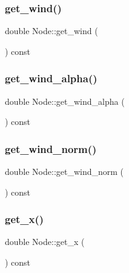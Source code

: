 \mbox{\label{class_node_a2d4f700eb12bf497b8d2a00376e82601}} 
\subsubsection{\texorpdfstring{get\_wind()}{get\_wind()}}
{\footnotesize\ttfamily double Node\+::get\+\_\+wind (\begin{DoxyParamCaption}{ }\end{DoxyParamCaption}) const}

\mbox{\label{class_node_ade32342e43c7fead12915f188afe5c9a}} 
\subsubsection{\texorpdfstring{get\_wind\_alpha()}{get\_wind\_alpha()}}
{\footnotesize\ttfamily double Node\+::get\+\_\+wind\+\_\+alpha (\begin{DoxyParamCaption}{ }\end{DoxyParamCaption}) const}

\mbox{\label{class_node_a7abd913f06a339257fed33984c732af4}} 
\subsubsection{\texorpdfstring{get\_wind\_norm()}{get\_wind\_norm()}}
{\footnotesize\ttfamily double Node\+::get\+\_\+wind\+\_\+norm (\begin{DoxyParamCaption}{ }\end{DoxyParamCaption}) const}

\mbox{\label{class_node_afb46d566c3b3f50eb9452ae2e0164c3a}} 
\subsubsection{\texorpdfstring{get\_x()}{get\_x()}}
{\footnotesize\ttfamily double Node\+::get\+\_\+x (\begin{DoxyParamCaption}{ }\end{DoxyParamCaption}) const}

